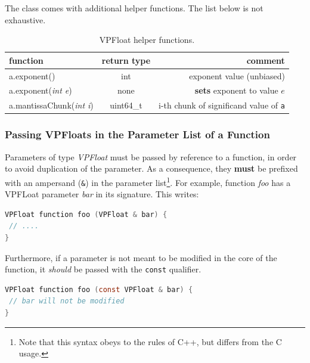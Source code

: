 \documentclass[11pt]{report}
\begin{document}
The class comes with additional helper functions. The list below is not exhaustive.
\begin{table}[h!]
  \begin{center}
    \caption{VPFloat helper functions.}
    \label{tab:table1}
    \begin{tabular}{l|c|r} %
      \textbf{function} & \textbf{return type} & \textbf{comment}\\
      \hline
      a.exponent() & int & exponent value (unbiased)\\
      \hline
      a.exponent(\emph{int e}) & none  & \textbf{sets} exponent to value $e$\\
      \hline
      a.mantissaChunk(\emph{int i}) & uint64\_t  & i-th chunk of significand value of \texttt{a} \\      
      \hline
    \end{tabular}
  \end{center}
\end{table}

\subsubsection{Passing VPFloats in the Parameter List of a Function}
Parameters of type \emph{VPFloat} must be passed by reference to a function, in order to avoid duplication of the parameter. As a consequence, they \textbf{must} be prefixed with an ampersand (\texttt{\&}) in the parameter list\footnote{Note that this syntax obeys to the rules of C++, but differs from the C usage.}.
For example, function \emph{foo} has a VPFLoat parameter \emph{bar} in its signature. This writes:\\
\begin{lstlisting}[language=C, caption = {VPFLoat example}]
VPFloat function foo (VPFloat & bar) {
 // ....
}
\end{lstlisting}

Furthermore, if a parameter is not meant to be modified in the core of the function, it \emph{should} be passed with the \texttt{const} qualifier.

\begin{lstlisting}[language=C, caption = {VPFLoat example}]
VPFloat function foo (const VPFloat & bar) {
 // bar will not be modified
}
\end{lstlisting}
\end{document}
